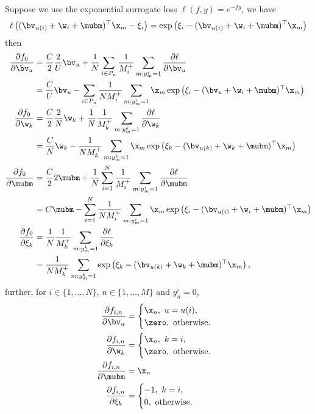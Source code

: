 Suppose we use the exponential surrogate loss $\ell(f, y) = e^{-fy}$, we have
\begin{equation*}
\ell \left( (\bv_{u(i)} + \w_i + \mubm)^\top \x_m - \xi_i \right) 
= \exp \left( \xi_i - (\bv_{u(i)} + \w_i + \mubm)^\top \x_m \right)
\end{equation*}
then
\begin{equation*}
\begin{aligned}
\frac{\partial f_0}{\partial \bv_u}
&= \frac{C}{2} \frac{2}{U} \bv_u + \frac{1}{N} \sum_{i \in P_u} \frac{1}{M_i^+} \sum_{m: y_m^i=1} \frac{\partial \ell}{\partial \bv_u} \\
&= \frac{C}{U} \bv_u - \sum_{i \in P_u} \frac{1}{N M_i^+} \sum_{m: y_m^i=1} \x_m \exp \left( \xi_i - (\bv_u + \w_i + \mubm)^\top \x_m \right) \\
%
\frac{\partial f_0}{\partial \w_k}
&= \frac{C}{2} \frac{2}{N} \w_k + \frac{1}{N} \frac{1}{M_k^+} \sum_{m: y_m^k=1} \frac{\partial \ell}{\partial \w_k} \\
&= \frac{C}{N} \w_k - \frac{1}{N M_k^+} \sum_{m: y_m^k=1} \x_m \exp \left( \xi_k - (\bv_{u(k)} + \w_k + \mubm)^\top \x_m \right) \\
%
\frac{\partial f_0}{\partial \mubm}
&= \frac{C}{2} 2 \mubm + \frac{1}{N} \sum_{i=1}^N \frac{1}{M_i^+} \sum_{m: y_m^i=1} \frac{\partial \ell}{\partial \mubm} \\
&= C \mubm - \sum_{i=1}^N \frac{1}{N M_i^+} \sum_{m: y_m^i=1} \x_m \exp \left( \xi_i - (\bv_{u(i)} + \w_i + \mubm)^\top \x_m \right) \\
%
\frac{\partial f_0}{\partial \xi_k}
&= \frac{1}{N} \frac{1}{M_k^+} \sum_{m: y_m^k=1} \frac{\partial \ell}{\partial \xi_k} \\
&= \frac{1}{N M_k^+} \sum_{m: y_m^k=1} \exp \left( \xi_k - (\bv_{u(k)} + \w_k + \mubm)^\top \x_m \right),
\end{aligned}
\end{equation*}
%
further, for $i \in \{1,\dots,N\}, \, n \in \{1,\dots,M\}$ and $y_n^i = 0$,
\begin{equation*}
\begin{aligned}
\frac{\partial f_{i,n}}{\partial \bv_u}
&= \begin{cases}
\x_n, \ u = u(i), \\
\zero, \ \text{otherwise}.
\end{cases} \\
%
\frac{\partial f_{i,n}}{\partial \w_k}
&= \begin{cases}
\x_n, \ k = i, \\
\zero, \ \text{otherwise}.
\end{cases} \\
%
\frac{\partial f_{i,n}}{\partial \mubm} &= \x_n \\
%
\frac{\partial f_{i,n}}{\partial \xi_k}
&= \begin{cases}
-1, \ k = i, \\
0, \ \text{otherwise}.
\end{cases}
\end{aligned}
\end{equation*}

